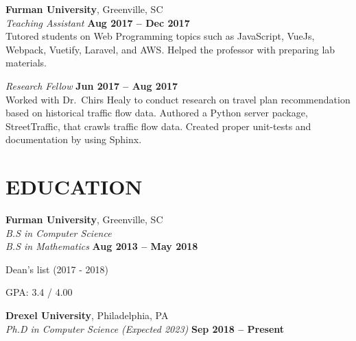 \documentclass[margin,line]{resume}
\begin{document}
\begin{resume}
    \textbf{\listing Furman University}, Greenville, SC \vspace{2mm}\\\vspace{1mm}%
    \textsl{Teaching Assistant} \vspace{2mm}\hfill \textbf{Aug 2017 -- Dec 2017}\\
    Tutored students on Web Programming topics such as JavaScript, VueJs, Webpack, Vuetify, Laravel, and
    AWS. Helped the professor with preparing lab materials. \vspace{1mm}
    
    \textsl{Research Fellow} \vspace{2mm}\hfill \textbf{Jun 2017 -- Aug 2017}\\
    Worked with Dr.~Chirs Healy to conduct research on travel plan recommendation based on historical traffic flow data. Authored a Python server package, StreetTraffic, that crawls traffic flow data. Created proper unit-tests and documentation by using Sphinx.




\sectionline

    \section{\mysidestyle \textbf{\large{E}\small{DUCATION}}}

    \textbf{\listing Furman University}, Greenville, SC \vspace{2mm}\\\vspace{1mm}%
    \textsl{B.S in Computer Science \\ B.S in Mathematics} \hfill \vspace{0.1cm} \textbf{ Aug 2013 -- May 2018}\vspace{-3mm}\\\vspace{-1mm}%
    \begin{list2}
        \item Dean's list (2017 - 2018)
        \item GPA: 3.4 / 4.00
    \end{list2}
    
    \textbf{\listing Drexel University}, Philadelphia, PA \vspace{2mm}\\\vspace{1mm}%
    \textsl{Ph.D in Computer Science (Expected 2023)} \hfill \vspace{0.1cm} \textbf{ Sep 2018 -- Present}\vspace{-3mm}\\\vspace{-1mm}%





\end{resume}
\end{document}
